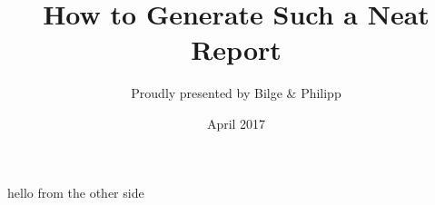\documentclass[bibliography=totocnumbered]{scrreprt}
\begin{document}
hello from the other side


\title{How to Generate Such a Neat Report}
\author{Proudly presented by Bilge \& Philipp}
\date{April 2017}
\maketitle

\tableofcontents 











\begin{comment}
\end{comment}
\end{document}
